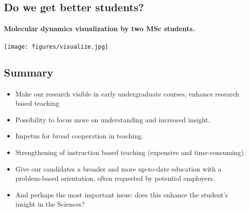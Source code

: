 \documentclass[%
twoside,                 %
final,                   %
10pt]{article}
\begin{document}
\noindent



\subsection{Do we get better students?}

\paragraph{Molecular dynamics visualization by two MSc students.}


\centerline{\texttt{[image: figures/visualize.jpg]}}







\subsection{Summary}

\paragraph{}

\begin{itemize}
\item Make our research visible in early undergraduate courses, enhance research based teaching

\item Possibility to focus more on understanding and increased insight.

\item Impetus for broad cooperation in teaching.

\item Strengthening of instruction based teaching (expensive and time-consuming).

\item Give our candidates a broader and more up-to-date education with a problem-based orientation, often requested by potential employers.

\item And perhaps the most important issue: does this enhance the student's insight in the Sciences?
\end{itemize}

\noindent







\printindex
\end{document}
